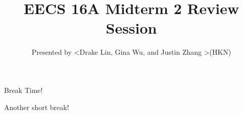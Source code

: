 

\title{EECS 16A Midterm 2 Review Session}
\author{Presented by \textless Drake Lin, Gina Wu, and Justin Zhang \textgreater (HKN)}
\date{}

\newcommand{\SlideAccessingLogistics}{@1024}










\begin{frame}
    Break Time!
\end{frame}




\begin{frame}
	Another short break!
\end{frame}

 








